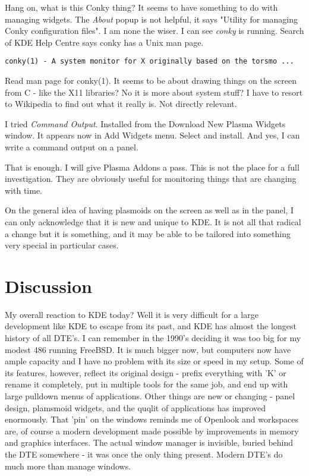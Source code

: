 \documentclass{article}  %
\begin{document}
Hang on, what is this Conky thing? It seems to have something to do with managing widgets. The {\em About} popup is not helpful, it says "Utility for managing Conky configuration files". I am none the wiser.  I can see {\em conky} is running.  Search of KDE Help Centre says conky has a Unix man page. 
\begin{verbatim}
conky(1) - A system monitor for X originally based on the torsmo ...
\end{verbatim}
Read man page for conky(1). It seems to be about drawing things on the screen from C - like the X11 libraries?  No it is more about system stuff?  I have to resort to Wikipedia to find out what it really is. Not directly relevant.

I tried {\em Command Output}. Installed from the Download New Plasma Widgets window. It appears now in Add Widgets menu. Select and install. And yes, I can write a command output on a panel.

That is enough. I will give Plasma Addons a pass.  This is not the place for a full investigation. They are obviously useful for monitoring things that are changing with time.

On the general idea of having plasmoids on the screen as well as in the panel, I can only acknowledge that it is new and unique to KDE. It is not all that radical a change but it is something, and it may be able to be tailored into something very special in particular cases.

\section{Discussion}
My overall reaction to KDE today? Well it is very difficult for a large development like KDE to escape from its past, and KDE has almost the longest history of all DTE's. I can remember in the 1990's deciding it was too big for my modest 486 running FreeBSD. It is much bigger now, but computers now have ample capacity and I have no problem with its size or speed in my setup.  Some of its features, however, reflect its original design - prefix everything with 'K' or rename it completely, put in multiple tools for the same job,  and end up with large pulldown menus of applications. Other things are new or changing - panel design, plamsmoid widgets, and the quqlit of applications has improved enormously. That 'pin' on the windows reminds me of Openlook and workspaces are, of course a modern development made possible by improvements in memory and graphics interfaces. The actual window manager is invisible, buried behind the DTE somewhere - it was once the only thing present. Modern DTE's do much more than manage windows.
\end{document}
